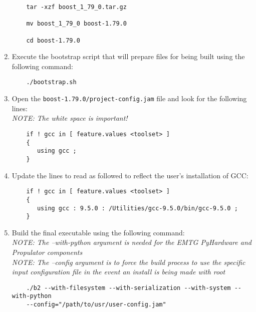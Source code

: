\begin{enumerate}
	\begin{verbatim}
	tar -xzf boost_1_79_0.tar.gz

	mv boost_1_79_0 boost-1.79.0

	cd boost-1.79.0
	\end{verbatim}
	
	\item Execute the bootstrap script that will prepare files for being built using the following command:
	\begin{verbatim}
	./bootstrap.sh
	\end{verbatim}

	\item Open the \texttt{boost-1.79.0/project-config.jam} file and look for the following lines: \\
	\textit{NOTE: The white space is important!}

	\begin{verbatim}
	if ! gcc in [ feature.values <toolset> ]
	{
	   using gcc ; 
	}
	\end{verbatim}

	\item Update the lines to read as followed to reflect the user's installation of \ac{GCC}:

	\begin{verbatim}
	if ! gcc in [ feature.values <toolset> ]
	{
	   using gcc : 9.5.0 : /Utilities/gcc-9.5.0/bin/gcc-9.5.0 ; 
	}
	\end{verbatim}

	\item Build the final executable using the following command: \\
	\textit{NOTE: The --with-python argument is needed for the \ac{EMTG} PyHardware and Propulator components} \\
	\textit{NOTE: The --config argument is to force the build process to use the specific input configuration file in the event an install is being made with root}
	
	\begin{verbatim}
	./b2 --with-filesystem --with-serialization --with-system --with-python 
	--config="/path/to/usr/user-config.jam"
	\end{verbatim}

\end{enumerate}